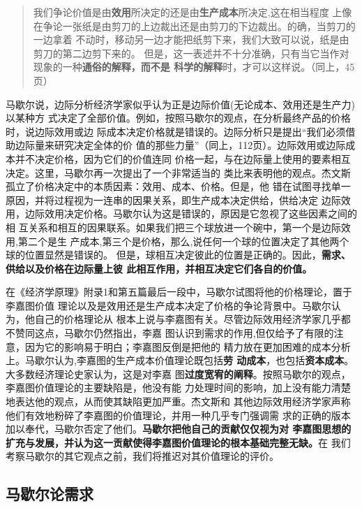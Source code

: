 \begin{quotation}
  我们争论价值是由\textbf{效用}所决定的还是由\textbf{生产成本}所决定,这在相当程度
  上像在争论一张纸是由剪刀的上边裁出还是由剪刀的下边裁出。的确，当剪刀的一边拿着
  不动时，移动另一边才能把纸剪下来，我们大致可以说，纸是由剪刀的第二边剪下来的。
  但是，这一表述并不十分准确，只有当它当作对现象的一种\textbf{通俗的解释，而不是
    科学的解释}时，才可以这样说。（同上，45页）
\end{quotation}

马歇尔说，边际分析经济学家似乎认为正是边际价值(无论成本、效用还是生产力)以某种方
式决定了全部价值。例如，按照马歇尔的观点，在分析最终产品的价格时，说边际效用或边
际成本决定价格就是错误的。边际分析只是提出“我们必须借助边际量来研究决定全体的价
值的那些力量”（同上，112页）。边际效用或边际成本并不决定价格，因为它们的价值连同
价格一起，与在边际量上使用的要素相互决定。这里，马歇尔再一次提出了一个非常适当的
类比来表明他的观点。杰文斯孤立了价格决定中的本质因素：效用、成本、价格。但是，他
错在试图寻找单一原因，并将过程视为一连串的因果关系，即生产成本决定供给，供给决定
边际效用，边际效用决定价格。马歇尔认为这是错误的，原因是它忽视了这些因素之间的相
互关系和相互的因果联系。如果我们把三个球放进一个碗中，第一个是边际效用,第二个是生
产成本,第三个是价格，那么,说任何一个球的位置决定了其他两个球的位置显然是错误的。
但是，球相互决定彼此的位置是正确的。因此，\textbf{需求、供给以及价格在边际量上彼
  此相互作用，并相互决定它们各自的价值。}

在《经济学原理》附录1和第五篇最后一段中，马歇尔试图将他的价格理论，置于李嘉图价值
理论以及是效用还是生产成本决定了价格的争论背景中。马歇尔认为，他自己的价格理论从
根本上说与李嘉图有关。尽管边际效用经济学家几乎都不赞同这点，马歇尔仍然指出，李嘉
图认识到需求的作用,但仅给予了有限的注意，因为它的影响易于明白；李嘉图反倒是把他的
精力放在更加困难的成本分析上。马歇尔认为,李嘉图的生产成本价值理论既包括\textbf{劳
  动成本}，也包括\textbf{资本成本}。大多数经济理论史家认为，这是对李嘉
图\textbf{过度宽宥的阐释}。按照马歇尔的观点，李嘉图价值理论的主要缺陷是，他没有能
力处理时间的影响，加上没有能力清楚地表达他的观点，从而使其缺陷更加严重。杰文斯和
其他边际效用经济学家声称他们有效地粉碎了李嘉图的价值理论，并用一种几乎专门强调需
求的正确的版本加以奉代，马歇尔否定了他们。\textbf{马歇尔把他自己的贡献仅仅视为对
  李嘉图思想的扩充与发展，并认为这一贡献使得李嘉图价值理论的根本基础完整无缺。}在
我们考察马歇尔的其它观点之前，我们将推迟对其价值理论的评价。

\subsection{马歇尔论需求}

